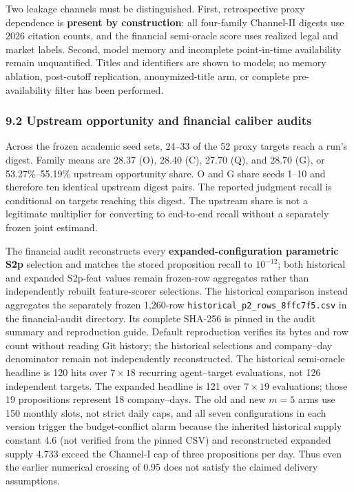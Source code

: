 \documentclass[
  11pt]{article}
\begin{document}
Two leakage channels must be distinguished. First, retrospective proxy
dependence is \textbf{present by construction}: all four-family
Channel-II digests use 2026 citation counts, and the financial
semi-oracle score uses realized legal and market labels. Second, model
memory and incomplete point-in-time availability remain unquantified.
Titles and identifiers are shown to models; no memory ablation,
post-cutoff replication, anonymized-title arm, or complete
pre-availability filter has been performed.

\subsubsection{9.2 Upstream opportunity and financial caliber
audits}\label{upstream-opportunity-and-financial-caliber-audits}

Across the frozen academic seed sets, 24--33 of the 52 proxy targets
reach a run's digest. Family means are 28.37 (O), 28.40 (C), 27.70 (Q),
and 28.70 (G), or 53.27\%--55.19\% upstream opportunity share. O and G
share seeds 1--10 and therefore ten identical upstream digest pairs. The
reported judgment recall is conditional on targets reaching this digest.
The upstream share is not a legitimate multiplier for converting to
end-to-end recall without a separately frozen joint estimand.

The financial audit reconstructs every \textbf{expanded-configuration
parametric S2p} selection and matches the stored proposition recall to
\(10^{-12}\); both historical and expanded S2p-feat values remain
frozen-row aggregates rather than independently rebuilt feature-scorer
selections. The historical comparison instead aggregates the separately
frozen 1,260-row \texttt{historical\_p2\_rows\_8ffc7f5.csv} in the
financial-audit directory. Its complete SHA-256 is pinned in the audit
summary and reproduction guide. Default reproduction verifies its bytes
and row count without reading Git history; the historical selections and
company--day denominator remain not independently reconstructed. The
historical semi-oracle headline is 120 hits over \(7\times18\) recurring
agent--target evaluations, not 126 independent targets. The expanded
headline is 121 over \(7\times19\) evaluations; those 19 propositions
represent 18 company--days. The old and new \(m=5\) arms use 150 monthly
slots, not strict daily caps, and all seven configurations in each
version trigger the budget-conflict alarm because the inherited
historical supply constant 4.6 (not verified from the pinned CSV) and
reconstructed expanded supply 4.733 exceed the Channel-I cap of three
propositions per day. Thus even the earlier numerical crossing of 0.95
does not satisfy the claimed delivery assumptions.
\end{document}
